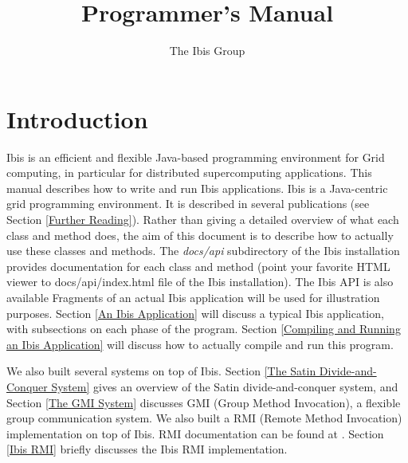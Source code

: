 \documentclass[10pt]{article}
\begin{document}
\title{
{}
{}
Programmer's Manual}

\author{The Ibis Group}

\maketitle

\section{Introduction}

Ibis is an efficient and flexible Java-based programming environment for Grid
computing, in particular for distributed supercomputing applications.
This manual describes how to write and run Ibis applications.
Ibis is a Java-centric grid programming environment.
It is described in several publications (see Section \ref{Further Reading}).
Rather than giving a detailed overview of what each class and method does,
the aim of this document is to describe how to actually use these classes
and methods.
The \emph{docs/api} subdirectory of the Ibis installation provides
documentation for each class and method (point your favorite HTML viewer
to docs/api/index.html file of the Ibis installation).
The Ibis API is also available
Fragments of an actual Ibis application will be used for illustration purposes.
Section \ref{An Ibis Application} will discuss a typical Ibis application,
with subsections on each phase of the program.
Section \ref{Compiling and Running an Ibis Application} will discuss how to
actually compile and run this program.

We also built several systems on top of Ibis.
Section \ref{The Satin Divide-and-Conquer System}
gives an overview of the Satin divide-and-conquer
system, and Section \ref{The GMI System} discusses GMI
(Group Method Invocation),
a flexible group communication system.
We also built a RMI (Remote Method Invocation)
implementation on top of Ibis. RMI documentation can be found at
{}
{}.
Section \ref{Ibis RMI} briefly discusses the Ibis RMI implementation.
\end{document}
